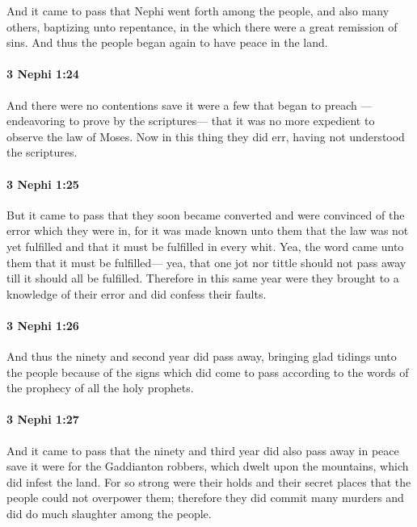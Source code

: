 			And it came to pass that
			Nephi went forth among the people, and also many others,
			baptizing unto repentance, in the which there were a great remission of sins.
			And thus the people began again to have peace in the land.

		\paragraph{3 Nephi 1:24} %
			\label{3NEPHI-1-24}

			And there were no contentions
			save it were a few that began to preach
			---endeavoring to prove by the scriptures---
			that it was no more expedient to observe the law of Moses.
			Now in this thing they did err, having not understood the scriptures.

		\paragraph{3 Nephi 1:25} %
			\label{3NEPHI-1-25}

			But it came to pass that they soon became converted
			and were convinced of the error which they were in,
			for it was made known unto them that the law was not yet fulfilled
			and that it must be fulfilled in every whit.
			Yea, the word came unto them that it must be fulfilled---
			yea, that one jot nor tittle should not pass away till it should all be fulfilled.
			Therefore in this same year were they brought to a knowledge of their error
			and did confess their faults.

		\paragraph{3 Nephi 1:26} %
			\label{3NEPHI-1-26}

			And thus the ninety and second year did pass away,
			bringing glad tidings unto the people
			because of the signs which did come to pass
			according to the words of the prophecy of all the holy prophets.

		\paragraph{3 Nephi 1:27} %
			\label{3NEPHI-1-27}

			And it came to pass that the ninety and third year did also pass away in peace
			save it were for the Gaddianton robbers, which dwelt upon the mountains,
			which did infest the land.
			For so strong were their holds and their secret places
			that the people could not overpower them;
			therefore they did commit many murders
			and did do much slaughter among the people.

